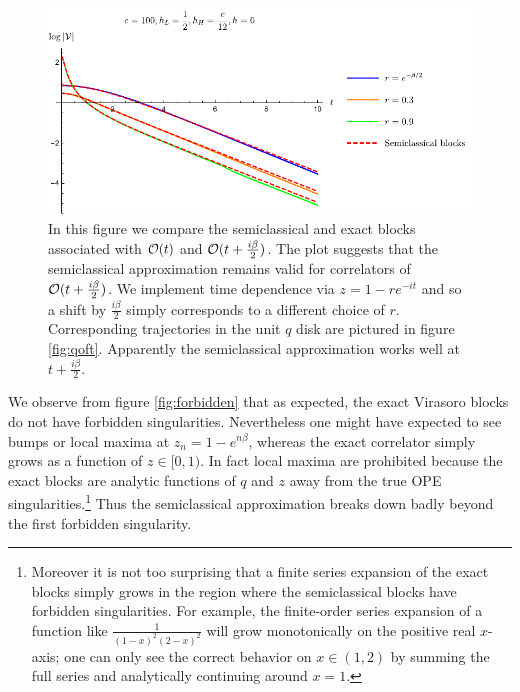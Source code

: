 \begin{figure}[t]
\hfill\includegraphics[]{virasoro_chapter/BetaOver2SemiClassical}
\caption[Performance of the semiclassical approximation at shifted time $t + \frac{i \beta}{2}$]{In this figure we compare the semiclassical and exact blocks associated with ${\cal O}(t)$ and ${\cal O}(t + \frac{i \beta}{2})$.  The plot suggests that the semiclassical approximation remains valid for correlators of ${\cal O}(t + \frac{i \beta}{2})$.  We implement time dependence via $z = 1 - r e^{-it}$ and so a shift by $\frac{i \beta}{2}$ simply corresponds to a different choice of $r$.  Corresponding trajectories in the unit $q$ disk are pictured in figure \ref{fig:qoft}.   Apparently the semiclassical approximation works well at $t + \frac{i \beta}{2}$.   }
\label{fig:betaover2}
\end{figure}


We observe from figure \ref{fig:forbidden} that as expected, the exact Virasoro blocks do not have forbidden singularities.  Nevertheless one might have expected to see bumps or local maxima at $z_n = 1 - e^{n \beta}$, whereas the exact correlator simply grows as a function of $z \in [0,1)$.  In fact local maxima are prohibited because the exact blocks are analytic functions of $q$ and $z$ away from the true OPE singularities.\footnote{Moreover it is not too surprising that a finite series expansion of the exact blocks simply grows in the region where the semiclassical blocks have forbidden singularities.  For example, the finite-order series expansion of a function like $\frac{1}{(1-x)^2(2-x)^2}$ will grow monotonically on the positive real $x$-axis; one can only see the correct behavior on $x \in (1,2)$ by summing the full series and analytically continuing around $x=1$.}  Thus the semiclassical approximation breaks down badly beyond the first forbidden singularity. 

